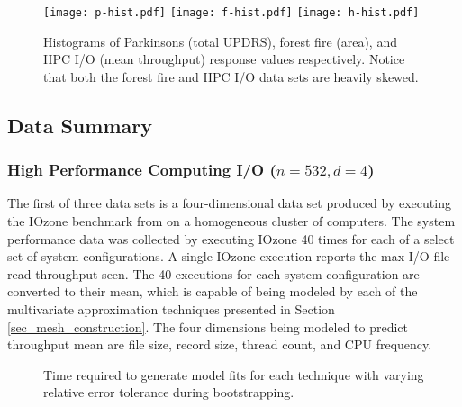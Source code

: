 \documentclass[sigconf]{acmart}
\begin{document}
\begin{figure}
  \texttt{[image: p-hist.pdf]}
  \texttt{[image: f-hist.pdf]}
  \texttt{[image: h-hist.pdf]}
  \caption{Histograms of Parkinsons (total UPDRS), forest fire (area), and HPC I/O (mean throughput) response values respectively. Notice that both the forest fire and HPC I/O data sets are heavily skewed.
  \vspace{-.5cm}}
  \label{fig_response_hists}
\end{figure}

\subsection{Data Summary}

\subsubsection{High Performance Computing I/O ($n = 532, d = 4$)}
The first of three data sets is a four-dimensional data set produced by executing the IOzone benchmark from \cite{iozone} on a homogeneous cluster of computers. The system performance data was collected by executing IOzone 40 times for each of a select set of system configurations. A single IOzone execution reports the max I/O file-read throughput seen. The 40 executions for each system configuration are converted to their mean, which is capable of being modeled by each of the multivariate approximation techniques presented in Section \ref{sec_mesh_construction}. The four dimensions being modeled to predict throughput mean are file size, record size, thread count, and CPU frequency.

\begin{figure*}[htb]
  \caption{Time required to generate model fits for each technique with varying relative error tolerance during bootstrapping.
    \vspace{-.3cm}}
  \label{fig_eval_times}
\end{figure*}
\end{document}
